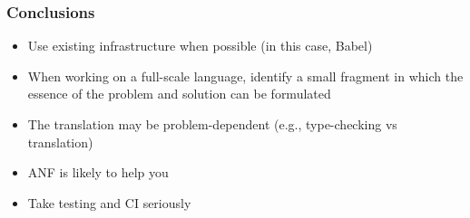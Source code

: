 \documentclass[8pt,pdf,handout]{beamer}
\begin{document}
\begin{frame}
\frametitle{Conclusions}

\begin{itemize}

  \item Use existing infrastructure when possible (in this case, Babel)
  \item When working on a full-scale language, identify a small fragment
  in which the essence of the problem and solution can be formulated
  \item The translation may be problem-dependent (e.g., type-checking
  vs translation)
  \item ANF is likely to help you
  \item Take testing and CI seriously

\end{itemize}

\end{frame}
\end{document}
